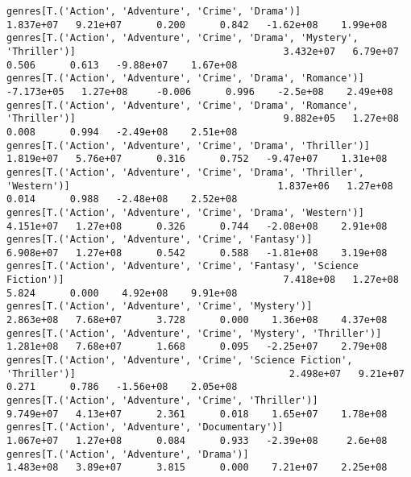 \documentclass[11pt]{article}
\begin{document}
\begin{Verbatim}[commandchars=\\\{\}]
genres[T.('Action', 'Adventure', 'Crime', 'Drama')]                                                           1.837e+07   9.21e+07      0.200      0.842   -1.62e+08    1.99e+08
genres[T.('Action', 'Adventure', 'Crime', 'Drama', 'Mystery', 'Thriller')]                                    3.432e+07   6.79e+07      0.506      0.613   -9.88e+07    1.67e+08
genres[T.('Action', 'Adventure', 'Crime', 'Drama', 'Romance')]                                               -7.173e+05   1.27e+08     -0.006      0.996    -2.5e+08    2.49e+08
genres[T.('Action', 'Adventure', 'Crime', 'Drama', 'Romance', 'Thriller')]                                    9.882e+05   1.27e+08      0.008      0.994   -2.49e+08    2.51e+08
genres[T.('Action', 'Adventure', 'Crime', 'Drama', 'Thriller')]                                               1.819e+07   5.76e+07      0.316      0.752   -9.47e+07    1.31e+08
genres[T.('Action', 'Adventure', 'Crime', 'Drama', 'Thriller', 'Western')]                                    1.837e+06   1.27e+08      0.014      0.988   -2.48e+08    2.52e+08
genres[T.('Action', 'Adventure', 'Crime', 'Drama', 'Western')]                                                4.151e+07   1.27e+08      0.326      0.744   -2.08e+08    2.91e+08
genres[T.('Action', 'Adventure', 'Crime', 'Fantasy')]                                                         6.908e+07   1.27e+08      0.542      0.588   -1.81e+08    3.19e+08
genres[T.('Action', 'Adventure', 'Crime', 'Fantasy', 'Science Fiction')]                                      7.418e+08   1.27e+08      5.824      0.000    4.92e+08    9.91e+08
genres[T.('Action', 'Adventure', 'Crime', 'Mystery')]                                                         2.863e+08   7.68e+07      3.728      0.000    1.36e+08    4.37e+08
genres[T.('Action', 'Adventure', 'Crime', 'Mystery', 'Thriller')]                                             1.281e+08   7.68e+07      1.668      0.095   -2.25e+07    2.79e+08
genres[T.('Action', 'Adventure', 'Crime', 'Science Fiction', 'Thriller')]                                     2.498e+07   9.21e+07      0.271      0.786   -1.56e+08    2.05e+08
genres[T.('Action', 'Adventure', 'Crime', 'Thriller')]                                                        9.749e+07   4.13e+07      2.361      0.018    1.65e+07    1.78e+08
genres[T.('Action', 'Adventure', 'Documentary')]                                                              1.067e+07   1.27e+08      0.084      0.933   -2.39e+08     2.6e+08
genres[T.('Action', 'Adventure', 'Drama')]                                                                    1.483e+08   3.89e+07      3.815      0.000    7.21e+07    2.25e+08

\end{Verbatim}
\end{document}
